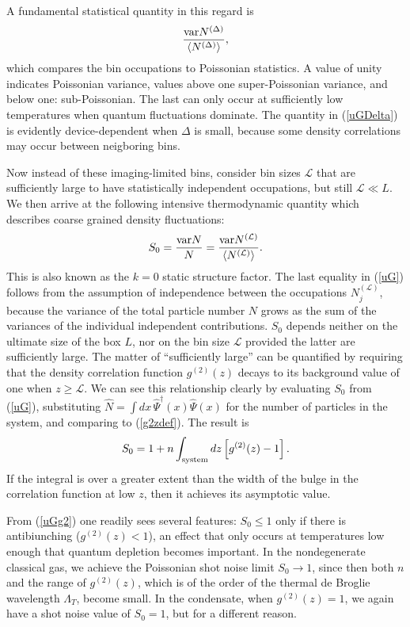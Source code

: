 \documentclass[aps,twocolumn,pra,superscriptaddress,nofootinbib,amsmath,amssymb,floats,floatfix,english]{revtex4-1}
\newcommand{\op}[1]{\widehat{#1}}
\newcommand{\dagop}[1]{\widehat{#1}^{\dagger}}
\newcommand{\mc}[1]{{\mathcal{#1}}}
\newcommand{\eqn}[1]{(\ref{#1})}
\renewcommand{\eq}[2]{\begin{equation}\label{#1}#2\end{equation}}
\begin{document}
A fundamental statistical quantity in this regard is 
\eq{uGDelta}{
\frac{{\rm var} N^{(\Delta)}}{\langle N^{(\Delta)}\rangle},
}
which compares the bin occupations to Poissonian statistics. A value of unity indicates Poissonian variance, values above one super-Poissonian variance, and below one: sub-Poissonian. The last  can only occur at sufficiently low temperatures when quantum fluctuations dominate.
The quantity in \eqn{uGDelta} is evidently device-dependent when $\Delta$ is small, because
 some density correlations may occur between neigboring bins. 

Now instead of these imaging-limited bins, consider bin sizes $\mc{L}$ that are sufficiently large to have statistically independent occupations, but still $\mc{L}\ll L$. We then arrive at the following intensive thermodynamic quantity which describes coarse grained density fluctuations:
\eq{uG}{
S_0  = \frac{{\rm var} N}{N} = \frac{{\rm var} N^{(\mc{L})}}{\langle N^{(\mc{L})}\rangle}.
}
This is also known as the $k = 0$ static structure factor. 
The last equality in \eqn{uG} follows from the assumption of independence between the occupations $N^{(\mc{L})}_j$, because 
the variance of the total particle number $N$ grows as the sum of the variances of the individual independent contributions. 
$S_0$ depends neither on the ultimate size of the box $L$, nor on the bin size $\mc{L}$ provided the latter are sufficiently large. 
The matter of ``sufficiently large'' can be quantified by requiring that the density correlation function $g^{(2)}(z)$ decays to its background value of one when $z\ge\mc{L}$. 
We can see this relationship clearly by evaluating $S_0$ from \eqn{uG}, substituting $\op{N}=\int dx\,\dagop{\Psi}(x)\op{\Psi}(x)$ for the number of particles in the system, and comparing to \eqn{g2zdef}. The result is 
\eq{uGg2}{
S_0 = 1 + n\int_{\rm system} dz \left[g^{(2)}(z)-1\right].
}
If the integral is over a greater extent than the width of the bulge in the correlation function at low $z$, then it achieves its asymptotic value. 

From \eqn{uGg2} one readily sees several features:
$S_0\le 1$ only if there is antibiunching ($g^{(2)}(z)<1$), an effect that only occurs at temperatures low enough that quantum depletion becomes important. In the nondegenerate classical gas, we achieve the Poissonian shot noise limit $S_0\to1$, since then both $n$ and the range of $g^{(2)}(z)$, which is of the order of the thermal de Broglie wavelength $\Lambda_T$, become small. In the condensate, when $g^{(2)}(z)=1$, we again have a shot noise value of $S_0=1$, but for a different reason.
\end{document}
